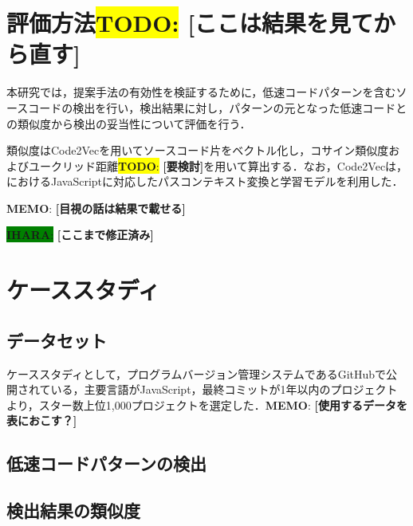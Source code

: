 \documentclass[submit,techrep,noauthor]{ipsj}
\newcommand{\todo}[1]{\colorbox{yellow}{{\bf TODO}:}{\color{red} {\textbf{[#1]}}}}
\newcommand{\memo}[1]{\colorbox{magenta!30}{{\bf MEMO}:}{\color{red!50} {\textbf{[#1]}}}}
\newcommand{\ihara}[1]{\colorbox{green}{{\bf IHARA}:}{\color{blue} {\textbf{[#1]}}}}
\begin{document}
\section{評価方法\todo{ここは結果を見てから直す}}

本研究では，提案手法の有効性を検証するために，低速コードパターンを含むソースコードの検出を行い，検出結果に対し，パターンの元となった低速コードとの類似度から検出の妥当性について評価を行う．

類似度はCode2Vec\cite{code2vec}を用いてソースコード片をベクトル化し，コサイン類似度およびユークリッド距離\todo{要検討}を用いて算出する．なお，Code2Vecは，\cite{saiki}におけるJavaScriptに対応したパスコンテキスト変換と学習モデルを利用した．

\memo{目視の話は結果で載せる}


\ihara{ここまで修正済み}

\section{ケーススタディ}
\label{sec:case-study}

\subsection{データセット}

ケーススタディとして，プログラムバージョン管理システムであるGitHubで公開されている，主要言語がJavaScript，最終コミットが1年以内のプロジェクトより，スター数上位1,000プロジェクトを選定した．\memo{使用するデータを表におこす？}

\subsection{低速コードパターンの検出}


\subsection{検出結果の類似度}
\end{document}
